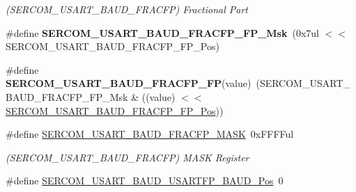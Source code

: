 \begin{DoxyCompactItemize}
\begin{DoxyCompactList}\small\item\em (S\+E\+R\+C\+O\+M\+\_\+\+U\+S\+A\+R\+T\+\_\+\+B\+A\+U\+D\+\_\+\+F\+R\+A\+C\+F\+P) Fractional Part \end{DoxyCompactList}\item 
\hypertarget{group___s_a_m_l21___s_e_r_c_o_m_ga4cf270e938072472f44ae1940a56b566}{}\#define {\bfseries S\+E\+R\+C\+O\+M\+\_\+\+U\+S\+A\+R\+T\+\_\+\+B\+A\+U\+D\+\_\+\+F\+R\+A\+C\+F\+P\+\_\+\+F\+P\+\_\+\+Msk}~(0x7ul $<$$<$ S\+E\+R\+C\+O\+M\+\_\+\+U\+S\+A\+R\+T\+\_\+\+B\+A\+U\+D\+\_\+\+F\+R\+A\+C\+F\+P\+\_\+\+F\+P\+\_\+\+Pos)\label{group___s_a_m_l21___s_e_r_c_o_m_ga4cf270e938072472f44ae1940a56b566}

\item 
\hypertarget{group___s_a_m_l21___s_e_r_c_o_m_ga22b46b25aa4ef70c591650a2175e112e}{}\#define {\bfseries S\+E\+R\+C\+O\+M\+\_\+\+U\+S\+A\+R\+T\+\_\+\+B\+A\+U\+D\+\_\+\+F\+R\+A\+C\+F\+P\+\_\+\+F\+P}(value)~(S\+E\+R\+C\+O\+M\+\_\+\+U\+S\+A\+R\+T\+\_\+\+B\+A\+U\+D\+\_\+\+F\+R\+A\+C\+F\+P\+\_\+\+F\+P\+\_\+\+Msk \& ((value) $<$$<$ \hyperlink{group___s_a_m_l21___s_e_r_c_o_m_ga72aa86a740a8156d437ce35cda870420}{S\+E\+R\+C\+O\+M\+\_\+\+U\+S\+A\+R\+T\+\_\+\+B\+A\+U\+D\+\_\+\+F\+R\+A\+C\+F\+P\+\_\+\+F\+P\+\_\+\+Pos}))\label{group___s_a_m_l21___s_e_r_c_o_m_ga22b46b25aa4ef70c591650a2175e112e}

\item 
\hypertarget{group___s_a_m_l21___s_e_r_c_o_m_ga7203b5be97175c56e8fb492d0c4e57eb}{}\#define \hyperlink{group___s_a_m_l21___s_e_r_c_o_m_ga7203b5be97175c56e8fb492d0c4e57eb}{S\+E\+R\+C\+O\+M\+\_\+\+U\+S\+A\+R\+T\+\_\+\+B\+A\+U\+D\+\_\+\+F\+R\+A\+C\+F\+P\+\_\+\+M\+A\+S\+K}~0x\+F\+F\+F\+Ful\label{group___s_a_m_l21___s_e_r_c_o_m_ga7203b5be97175c56e8fb492d0c4e57eb}

\begin{DoxyCompactList}\small\item\em (S\+E\+R\+C\+O\+M\+\_\+\+U\+S\+A\+R\+T\+\_\+\+B\+A\+U\+D\+\_\+\+F\+R\+A\+C\+F\+P) M\+A\+S\+K Register \end{DoxyCompactList}\item 
\hypertarget{group___s_a_m_l21___s_e_r_c_o_m_gaf86d9c38d1591af77a7b7a1007ccd5d6}{}\#define \hyperlink{group___s_a_m_l21___s_e_r_c_o_m_gaf86d9c38d1591af77a7b7a1007ccd5d6}{S\+E\+R\+C\+O\+M\+\_\+\+U\+S\+A\+R\+T\+\_\+\+B\+A\+U\+D\+\_\+\+U\+S\+A\+R\+T\+F\+P\+\_\+\+B\+A\+U\+D\+\_\+\+Pos}~0\label{group___s_a_m_l21___s_e_r_c_o_m_gaf86d9c38d1591af77a7b7a1007ccd5d6}


\end{DoxyCompactItemize}
